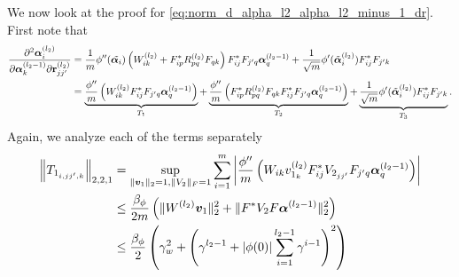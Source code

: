     We now look at the proof for \eqref{eq:norm_d_alpha_l2_alpha_l2_minus_1_dr}. First note that
    \begin{align*}
        \begin{aligned}            
            \frac{\partial^2 \boldsymbol{\alpha}^{\left(l_2\right)}_i}{\partial \boldsymbol{\alpha}^{\left(l_2-1\right)}_{k} \partial \mathbf{r}_{j j^{\prime}}^{\left(l_2\right)}}
        &=
        \frac{1}{m}\phi''(\tilde{\boldsymbol{\alpha}_i}) \left(W_{i k}^{\left(l_2\right)}
        +
        F_{i p}^* R_{p q}^{\left(l_2\right)} F_{q k}\right) F_{i j}^{*} F_{j' q} \boldsymbol{\alpha}_q^{\left(l_2-1\right)} + \frac{1}{\sqrt{m}}\phi' (\tilde{\boldsymbol{\alpha}}_i^{(l_2)}) F^{*}_{ij}F_{j'k} \\
        &= \underbrace{\frac{\phi''}{m} \left(W_{i k}^{\left(l_2\right)}F_{i j}^{*} F_{j' q} \boldsymbol{\alpha}_q^{\left(l_2-1\right)} \right)}_{T_1}
        + \underbrace{\frac{\phi''}{m}
        \left( 
            F_{i p}^* R_{p q}^{\left(l_2\right)} F_{q k}F_{i j}^{*} F_{j'q}\boldsymbol{\alpha}_q^{\left(l_2-1\right)}
        \right)}_{T_2}
        + \underbrace{\frac{1}{\sqrt{m}}\phi' (\tilde{\boldsymbol{\alpha}}_i^{(l_2)}) F^{*}_{ij}F_{j'k}}_{T_3}.
        \end{aligned}
    \end{align*}
    Again, we analyze each of the terms separately
    \begin{align}
    \label{eq:T1_norm_d2_alpha_d_alpha_d_r}
        \begin{aligned}
            \left\|T_{1_{i,jj',k}} \right\|_{2,2,1} 
            &= \sup_{\|{\bm{v}}_1\|_2 = 1, \|V_2\|_F =1} \sum_{i=1}^m \left| 
                \frac{\phi''}{m} \left(W_{i k}v_{1_k}^{\left(l_2\right)}F_{i j}^{*}V_{2_{jj'}} F_{j' q} \boldsymbol{\alpha}_q^{\left(l_2-1\right)} \right)
            \right|\\
            &\leq \frac{\beta_{\phi}}{2m} \left( 
                \|W^{(l_2)}{\bm{v}}_1 \|_{2}^2 + \|F^*V_2F\boldsymbol{\alpha}^{(l_2 - 1)}\|_{2}^2 
            \right)\\
            &\leq \frac{\beta_{\phi}}{2}\left( 
                \gamma_w^2 + \left( \gamma^{l_2 - 1} + |\phi(0)|\sum_{i=1}^{l_2 - 1} \gamma^{i-1}\right)^2
            \right)
        \end{aligned}
    \end{align}
